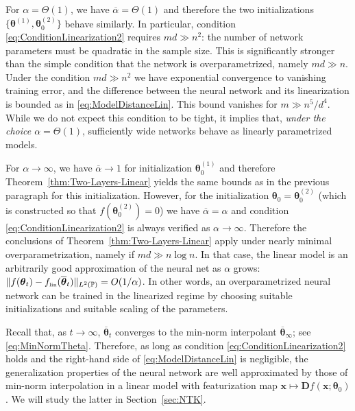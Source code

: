 For $\alpha =\Theta(1)$, we have $\overline{\alpha} =\Theta(1)$  and therefore the two initializations $\{{\boldsymbol \theta}^{(1)},{\boldsymbol \theta}_0^{(2)}\}$
behave similarly. In particular, condition \eqref{eq:ConditionLinearization2}  requires $m d\gg n^2$: the number of network parameters must be quadratic in the sample size. This is significantly stronger than the simple condition that the network is overparametrized, namely $md\gg n$. Under the condition $m d\gg n^2$ we have exponential convergence to vanishing training error, and  the difference between the neural network and its linearization   is bounded as in \eqref{eq:ModelDistanceLin}.  This bound vanishes for  $m\gg n^5/d^4$. While we do not expect this condition to be tight, it implies that, \emph{under the choice $\alpha=\Theta(1)$}, sufficiently wide networks behave as linearly parametrized  models.

For $\alpha \to\infty$, we have $\overline{\alpha}\to 1$ for initialization
${\boldsymbol \theta}_0^{(1)}$  and therefore Theorem~\ref{thm:Two-Layers-Linear} yields the same bounds as in the previous paragraph for this initialization. However, for the  initialization ${\boldsymbol \theta}_0={\boldsymbol \theta}_0^{(2)}$
(which is constructed so that $f({\boldsymbol \theta}^{(2)}_0) =0$)  we have $\overline{\alpha} = \alpha$ and condition \eqref{eq:ConditionLinearization2} is always verified as $\alpha\to \infty$.
Therefore the conclusions of Theorem~\ref{thm:Two-Layers-Linear} apply under nearly minimal overparametrization, namely if $md\gg n\log n$. In that case, the linear model is an arbitrarily good approximation of the neural net as $\alpha$ grows:  $\|f({\boldsymbol \theta}_t)
-f_{\mbox{\rm\tiny lin}}(\overline{\boldsymbol \theta}_t)\|_{L^2(\mathbb{P})}= O(1/\alpha)$.
In other words, an overparametrized neural network can be trained in the linearized regime by choosing suitable initializations and suitable scaling of the parameters.

Recall   that, as $t\to\infty$,  $\overline{\boldsymbol \theta}_t$ converges to the min-norm interpolant $\overline{\boldsymbol \theta}_{\infty}$; see \eqref{eq:MinNormTheta}.
Therefore, as long as condition \eqref{eq:ConditionLinearization2}  holds and the right-hand side of \eqref{eq:ModelDistanceLin} is negligible, the generalization properties of the neural network are well approximated by those of min-norm interpolation in a linear model with featurization map ${\boldsymbol x}\mapsto {\boldsymbol D} f({\boldsymbol x};{\boldsymbol \theta}_0)$. We will study the latter in Section~\ref{sec:NTK}.

